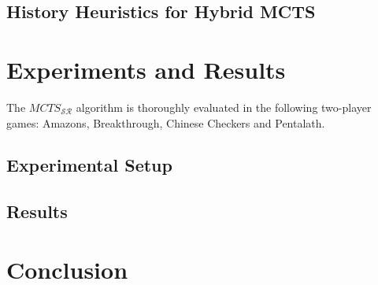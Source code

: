 \documentclass{kecsmstr}
\newcommand{\mctssr}{MCTS_{\mathcal{S}\mathcal{R}}}
\begin{document}
\section{History Heuristics for Hybrid MCTS}
\label{sec:proghist}

\chapter{Experiments and Results}
\label{chap:experiments}
\begin{chaptercontents}
The $\mctssr$ algorithm is thoroughly evaluated in the following two-player games: Amazons, Breakthrough, Chinese Checkers and Pentalath.
\end{chaptercontents}
\section{Experimental Setup}

\section{Results}

\chapter{Conclusion}
\label{chap:conclusion}

 \emptypage

\appendix



 \emptypage

\end{document}
